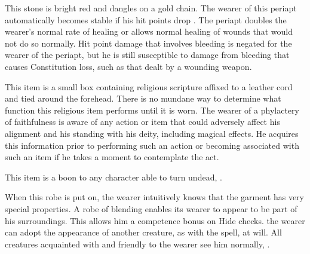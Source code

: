  This stone is bright red and dangles on a gold chain. The wearer of this periapt automatically becomes stable if his hit points drop . The periapt doubles the wearer's normal rate of healing or allows normal healing of wounds that would not do so normally. Hit point damage that involves bleeding is negated for the wearer of the periapt, but he is still susceptible to damage from bleeding that causes Constitution loss, such as that dealt by a wounding weapon.

 This item is a small box containing religious scripture affixed to a leather cord and tied around the forehead. There is no mundane way to determine what function this religious item performs until it is worn. The wearer of a phylactery of faithfulness is aware of any action or item that could adversely affect his alignment and his standing with his deity, including magical effects. He acquires this information prior to performing such an action or becoming associated with such an item if he takes a moment to contemplate the act.

 This item is a boon to any character able to turn undead, .

 When this robe is put on, the wearer intuitively knows that the garment has very special properties. A robe of blending enables its wearer to appear to be part of his surroundings. This allows him a  competence bonus on Hide checks.  the wearer can adopt the appearance of another creature, as with the  spell, at will. All creatures acquainted with and friendly to the wearer see him normally, .

